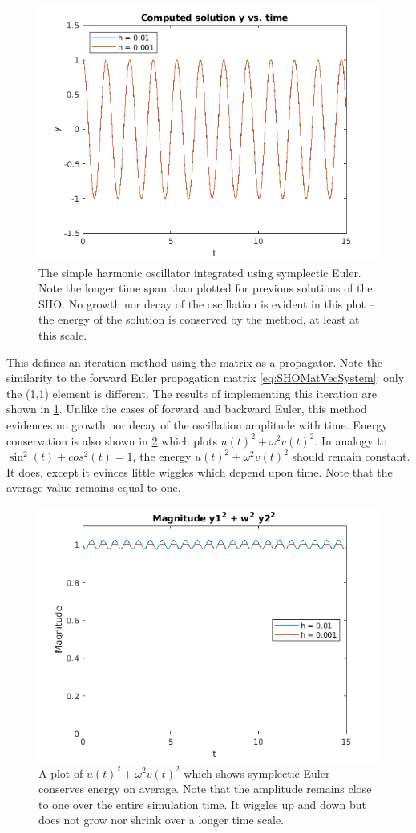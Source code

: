 \documentclass[hidelinks,notitlepage]{book}
\begin{document}
\begin{figure}[ht]
	\centering
	\includegraphics[width=0.7\columnwidth]{SymplecticEulerSHO.png}
	\caption{The simple harmonic oscillator integrated using symplectic Euler.  Note the longer time span than plotted for previous solutions of the SHO.  No growth nor decay of the oscillation is evident in this plot -- the energy of the solution is conserved by the method, at least at this scale.  }
	\label{fig:SymplecticEulerSHO}
\end{figure}
This defines an iteration method using the matrix as a propagator.  Note the similarity to the forward Euler propagation matrix \cref{eq:SHOMatVecSystem}:  only the (1,1) element is different.  
The results of implementing this iteration are shown in \cref{fig:SymplecticEulerSHO}.  Unlike the cases of forward and backward Euler, this method evidences no growth nor decay of the oscillation amplitude with time.
Energy conservation is also shown in \cref{fig:SymplecticEulerEnergy} which plots $u(t)^2 + \omega^2 v(t)^2$.  In analogy to $\sin^2(t) + cos^2(t) = 1$, the energy $u(t)^2 + \omega^2 v(t)^2$ should remain constant.  It does, except it evinces little wiggles which depend upon time.  Note that the average value remains equal to one.
\begin{figure}[htb]
	\centering
	\includegraphics[width=0.7\columnwidth]{SymplecticEulerEnergy.png}
	\caption{A plot of $u(t)^2 + \omega^2 v(t)^2$ which shows symplectic Euler conserves energy on average.  Note that the amplitude remains close to one over the entire simulation time.  It wiggles up and down but does not grow nor shrink over a longer time scale.}
	\label{fig:SymplecticEulerEnergy}
\end{figure}
\end{document}

